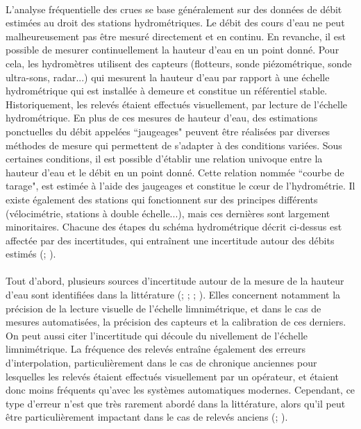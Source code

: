 	\paragraph{} L'analyse fréquentielle des crues se base généralement sur des données de débit estimées au droit des stations hydrométriques. Le débit des cours d'eau ne peut malheureusement pas être mesuré directement et en continu. En revanche, il est possible de mesurer continuellement la hauteur d'eau en un point donné. Pour cela, les hydromètres utilisent des capteurs (flotteurs, sonde piézométrique, sonde ultra-sons, radar...) qui mesurent la hauteur d'eau par rapport à une échelle hydrométrique qui est installée à demeure et constitue un référentiel stable. Historiquement, les relevés étaient effectués visuellement, par lecture de l'échelle hydrométrique. En plus de ces mesures de hauteur d'eau, des estimations ponctuelles du débit appelées ``jaugeages" peuvent être réalisées par diverses méthodes de mesure qui permettent de s'adapter à des conditions variées. Sous certaines conditions, il est possible d'établir une relation univoque entre la hauteur d'eau et le débit en un point donné. Cette relation nommée ``courbe de tarage", est estimée à l'aide des jaugeages et constitue le cœur de l'hydrométrie. Il existe également des stations qui fonctionnent sur des principes différents (vélocimétrie, stations à double échelle...), mais ces dernières sont largement minoritaires. Chacune des étapes du schéma hydrométrique décrit ci-dessus est affectée par des incertitudes, qui entraînent une incertitude autour des débits estimés (\cite{mcmillan_benchmarking_2012}; \cite{puechberty_charte_2017}). 
	
	\paragraph{} Tout d'abord, plusieurs sources d'incertitude autour de la mesure de la hauteur d'eau sont identifiées dans la littérature (\cite{van_der_made_determination_1982}; \cite{petersen-overleir_uncertainty_2005}; \cite{mcmillan_benchmarking_2012}; \cite{horner_impact_2018}). Elles concernent notamment la précision de la lecture visuelle de l'échelle limnimétrique, et dans le cas de mesures automatisées, la précision des capteurs et la calibration de ces derniers. On peut aussi citer l'incertitude qui découle du nivellement de l'échelle limnimétrique. La fréquence des relevés entraîne également des erreurs d'interpolation, particulièrement dans le cas de chronique anciennes pour lesquelles les relevés étaient effectués visuellement par un opérateur, et étaient donc moins fréquents qu'avec les systèmes automatiques modernes. Cependant, ce type d'erreur n'est que très rarement abordé dans la littérature, alors qu'il peut être particulièrement impactant dans le cas de relevés anciens (\cite{hamilton_quantifying_2012}; \cite{kuentz_hydrometrie_2014}).
	
